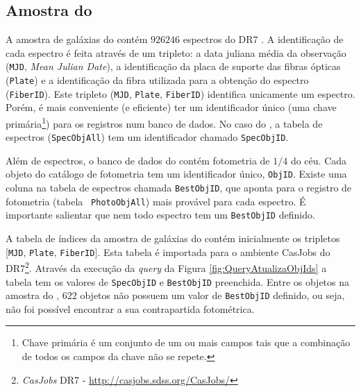 \subsection{Amostra do \STARLIGHT}
\label{sec:Crossmatch:AmostraStarlight}

A amostra de galáxias do \starlight contém $926246$ espectros do \SDSS DR7
\citep{Abazajian2009}. A identificação de cada espectro é feita através de um
tripleto: a data juliana média da observação (\texttt{MJD}, {\em Mean Julian
Date}), a identificação da placa de suporte das fibras ópticas (\texttt{Plate})
e a identificação da fibra utilizada para a obtenção do espectro
(\texttt{FiberID}). Este tripleto (\texttt{MJD}, \texttt{Plate},
\texttt{FiberID}) identifica unicamente um espectro. Porém, é mais conveniente
(e eficiente) ter um identificador único (uma chave primária\footnote{Chave
primária é um conjunto de um ou mais campos tais que a combinação de todos os
campos da chave não se repete.}) para os registros num banco de dados. No caso
do \SDSS, a tabela de espectros (\texttt{SpecObjAll}) tem um identificador
chamado \texttt{SpecObjID}.

Além de espectros, o banco de dados do \SDSS contém fotometria de $1/4$ do céu.
Cada objeto do catálogo de fotometria tem um identificador único,
\texttt{ObjID}. Existe uma coluna na tabela de espectros chamada
\texttt{BestObjID}, que aponta para o registro de fotometria (tabela {\tt
PhotoObjAll}) mais provável para cada espectro. É importante salientar que nem
todo espectro tem um \texttt{BestObjID} definido.

A tabela de índices da amostra de galáxias do \starlight contém inicialmente os
tripletos [\texttt{MJD}, \texttt{Plate}, \texttt{FiberID}]. Esta tabela é
importada para o ambiente {CasJobs} do \SDSS DR7\footnote{{\em CasJobs} \SDSS
DR7 - \url{http://casjobs.sdss.org/CasJobs/}}. Através da execução da {\em
query} da Figura \ref{fig:QueryAtualizaObjIds} a tabela tem os valores de
\texttt{SpecObjID} e \texttt{BestObjID} preenchida. Entre os objetos na amostra
do \starlight, $622$ objetos não possuem um valor de \texttt{BestObjID}
definido, ou seja, não foi possível encontrar a sua contrapartida fotométrica.



